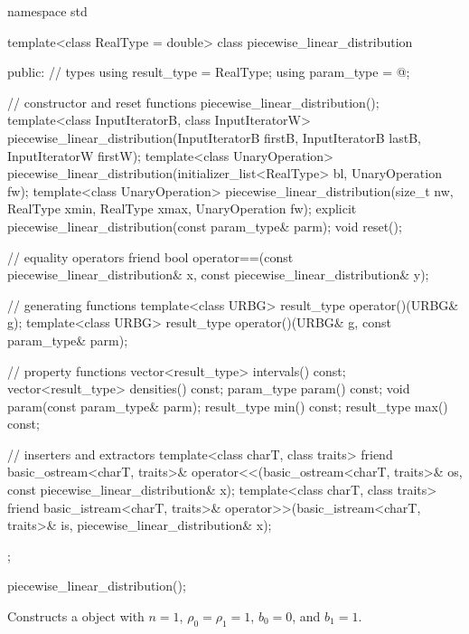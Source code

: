 %
%
\begin{codeblock}
namespace std {
  template<class RealType = double>
  class piecewise_linear_distribution {
  public:
    // types
    using result_type = RealType;
    using param_type  = @\unspec@;

    // constructor and reset functions
    piecewise_linear_distribution();
    template<class InputIteratorB, class InputIteratorW>
      piecewise_linear_distribution(InputIteratorB firstB, InputIteratorB lastB,
                                    InputIteratorW firstW);
    template<class UnaryOperation>
      piecewise_linear_distribution(initializer_list<RealType> bl, UnaryOperation fw);
    template<class UnaryOperation>
      piecewise_linear_distribution(size_t nw, RealType xmin, RealType xmax, UnaryOperation fw);
    explicit piecewise_linear_distribution(const param_type& parm);
    void reset();

    // equality operators
    friend bool operator==(const piecewise_linear_distribution& x,
                           const piecewise_linear_distribution& y);

    // generating functions
    template<class URBG>
      result_type operator()(URBG& g);
    template<class URBG>
      result_type operator()(URBG& g, const param_type& parm);

    // property functions
    vector<result_type> intervals() const;
    vector<result_type> densities() const;
    param_type param() const;
    void param(const param_type& parm);
    result_type min() const;
    result_type max() const;

    // inserters and extractors
    template<class charT, class traits>
      friend basic_ostream<charT, traits>&
        operator<<(basic_ostream<charT, traits>& os, const piecewise_linear_distribution& x);
    template<class charT, class traits>
      friend basic_istream<charT, traits>&
        operator>>(basic_istream<charT, traits>& is, piecewise_linear_distribution& x);
  };
}
\end{codeblock}

\begin{itemdecl}
piecewise_linear_distribution();
\end{itemdecl}

\begin{itemdescr}
\pnum
\effects
Constructs a  object
 with $n = 1$,
 $\rho_0 = \rho_1 = 1$,
 $b_0 = 0$,
 and $b_1 = 1$.
\end{itemdescr}

